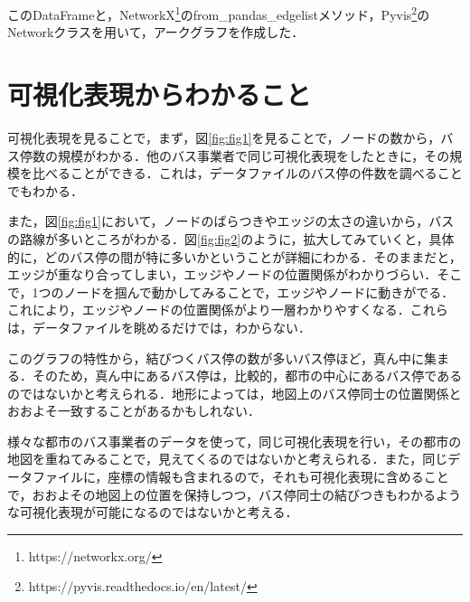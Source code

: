 \documentclass[12pt,a4paper,dvipdfmx,titlepage]{jsarticle}
\begin{document}
このDataFrameと，NetworkX\footnote{https://networkx.org/}のfrom\_pandas\_edgelistメソッド，Pyvis\footnote{https://pyvis.readthedocs.io/en/latest/}のNetworkクラスを用いて，アークグラフを作成した．

\section*{可視化表現からわかること}
可視化表現を見ることで，まず，図\ref{fig:fig1}を見ることで，ノードの数から，バス停数の規模がわかる．他のバス事業者で同じ可視化表現をしたときに，その規模を比べることができる．これは，データファイルのバス停の件数を調べることでもわかる．

また，図\ref{fig:fig1}において，ノードのばらつきやエッジの太さの違いから，バスの路線が多いところがわかる．図\ref{fig:fig2}のように，拡大してみていくと，具体的に，どのバス停の間が特に多いかということが詳細にわかる．そのままだと，エッジが重なり合ってしまい，エッジやノードの位置関係がわかりづらい．そこで，1つのノードを掴んで動かしてみることで，エッジやノードに動きがでる．これにより，エッジやノードの位置関係がより一層わかりやすくなる．これらは，データファイルを眺めるだけでは，わからない．

このグラフの特性から，結びつくバス停の数が多いバス停ほど，真ん中に集まる．そのため，真ん中にあるバス停は，比較的，都市の中心にあるバス停であるのではないかと考えられる．地形によっては，地図上のバス停同士の位置関係とおおよそ一致することがあるかもしれない．

様々な都市のバス事業者のデータを使って，同じ可視化表現を行い，その都市の地図を重ねてみることで，見えてくるのではないかと考えられる．また，同じデータファイルに，座標の情報も含まれるので，それも可視化表現に含めることで，おおよその地図上の位置を保持しつつ，バス停同士の結びつきもわかるような可視化表現が可能になるのではないかと考える．
\end{document}
